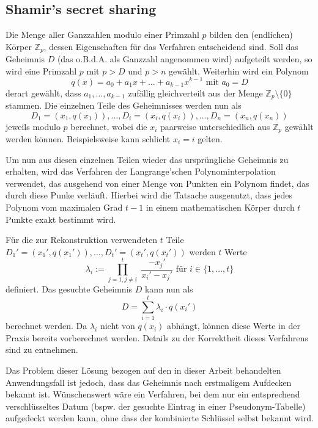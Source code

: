 \subsection*{Shamir's secret sharing}

Die Menge aller Ganzzahlen modulo einer Primzahl \(p\) bilden den (endlichen) Körper \(\mathbb{Z}_p\), dessen Eigenschaften für das Verfahren entscheidend sind. Soll das Geheimnis \(D\) (das o.B.d.A. als Ganzzahl angenommen wird) aufgeteilt werden, so wird eine Primzahl \(p\) mit \(p > D\) und \(p > n\) gewählt. Weiterhin wird ein Polynom 
\[q(x) = a_0 + a_1x + \dots + a_{k-1}x^{k-1} \text{ mit } a_0 = D\] 
derart gewählt, dass \(a_1, \dots, a_{k-1}\) zufällig gleichverteilt aus der Menge \(\mathbb{Z}_p \setminus \{0\}\) stammen. Die einzelnen Teile des Geheimnisses werden nun als
\[D_1=(x_1,q(x_1)), \dots, D_i=(x_i,q(x_i)), \dots, D_n=(x_n,q(x_n))\]
jeweils modulo \(p\) berechnet, wobei die \(x_i\) paarweise unterschiedlich aus \(\mathbb{Z}_p\) gewählt werden können. Beispielsweise kann schlicht \(x_i = i\) gelten.

Um nun aus diesen einzelnen Teilen wieder das ursprüngliche Geheimnis zu erhalten, wird das Verfahren der Langrange'schen Polynominterpolation verwendet, das ausgehend von einer Menge von Punkten ein Polynom findet, das durch diese Punke verläuft. Hierbei wird die Tatsache ausgenutzt, dass jedes Polynom vom maximalen Grad \(t-1\) in einem mathematischen Körper durch \(t\) Punkte exakt bestimmt wird.

Für die zur Rekonstruktion verwendeten \(t\) Teile \(D_1'=(x_1',q(x_1')),\dots,D_t'=(x_t',q(x_t'))\) werden \(t\) Werte 
\[\lambda_i := \prod_{j=1, j \not= i}^{t} \; \frac{- x_j'}{x_i' - x_j'} \text{ für } i \in \{1,\dots,t\}\] 
definiert. Das gesuchte Geheimnis \(D\) kann nun als
\[D = \sum_{i=1}^{t}\lambda_i \cdot q(x_i')\]
berechnet werden. Da \(\lambda_i\) nicht von \(q(x_i)\) abhängt, können diese Werte in der Praxis bereits vorberechnet werden. Details zu der Korrektheit dieses Verfahrens sind \cite{boneh2016} zu entnehmen.

Das Problem dieser Lösung bezogen auf den in dieser Arbeit behandelten Anwendungsfall ist jedoch, dass das Geheimnis nach erstmaligem Aufdecken bekannt ist. Wünschenswert wäre ein Verfahren, bei dem nur ein entsprechend verschlüsseltes Datum (bspw. der gesuchte Eintrag in einer Pseudonym-Tabelle) aufgedeckt werden kann, ohne dass der kombinierte Schlüssel selbst bekannt wird. 

